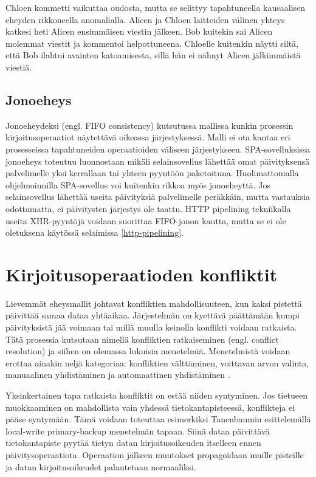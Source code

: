 \documentclass[finnish,twoside,censored,csm,sw-track-2018]{HYthesisML}
\begin{document}
Chloen kommetti vaikuttaa oudosta, mutta se selittyy tapahtuneella kausaalisen eheyden rikkoneella anomalialla. Alicen ja Chloen laitteiden välinen yhteys katkesi heti Alicen ensimmäisen viestin jälkeen. Bob kuitekin sai Alicen molemmat viestit ja kommentoi helpottuneena. Chloelle kuitenkin näytti siltä, että Bob ilahtui avainten katoamisesta, sillä hän ei nähnyt Alicen jälkimmäistä viestiä.

\subsection{Jonoeheys}

Jonoeheydeksi (engl. FIFO consistency) kutsutussa mallissa kunkin prosessin kirjoitusoperaatiot näytettävä oikeassa järjestyksessä. Malli ei ota kantaa eri prosesseissa tapahtuneiden operaatioiden väliseen järjestykseen. SPA-sovelluksissa jonoeheys toteutuu luonnostaan mikäli selainsovellus lähettää omat päivityksensä palvelimelle yksi kerrallaan tai yhteen pyyntöön paketoituna. Huolimattomalla ohjelmoinnilla SPA-sovellus voi kuitenkin rikkoa myös jonoeheyttä. Jos selainsovellus lähettää useita päivityksiä palvelimelle peräkkäin, mutta vastauksia odottamatta, ei päivitysten järjestys ole taattu. HTTP pipelining tekniikalla useita XHR-pyyntöjä voidaan suorittaa FIFO-jonon kautta, mutta se ei ole oletuksena käytössä selaimissa \ref{http-pipelining}.

\section{Kirjoitusoperaatioden konfliktit}

Lievemmät eheysmallit johtavat konfliktien mahdollisuuteen, kun kaksi pistettä päivittää samaa dataa yhtäaikaa. Järjestelmän on kyettävä päättämään kumpi päivityksistä jää voimaan tai millä muulla keinolla konflikti voidaan ratkaista. Tätä prosessia kutsutaan nimellä konfliktien ratkaiseminen (engl. conflict resolution) ja siihen on olemassa lukuisia menetelmiä. Menetelmistä voidaan erottaa ainakin neljä kategoriaa: konfliktien välttäminen, voittavan arvon valinta, manuaalinen yhdistäminen ja automaattinen yhdistäminen \citep{Kleppmann}.

Yksinkertainen tapa ratkaista konfliktit on estää niiden syntyminen. Jos tietueen muokkaaminen on mahdollista vain yhdessä tietokantapisteessä, konflikteja ei pääse syntymään. Tämä voidaan toteuttaa esimerkiksi Tanenbaumin \citep{Tanenbaum} esittelemällä local-write primary-backup menetelmän tapaan. Siinä dataa päivittävä tietokantapiste pyytää tietyn datan kirjoitusoikeuden itselleen ennen päivitysoperaatiota. Operaation jälkeen muutokset propagoidaan muille pisteille ja datan kirjoitusoikeudet palautetaan normaaliksi.
\end{document}
